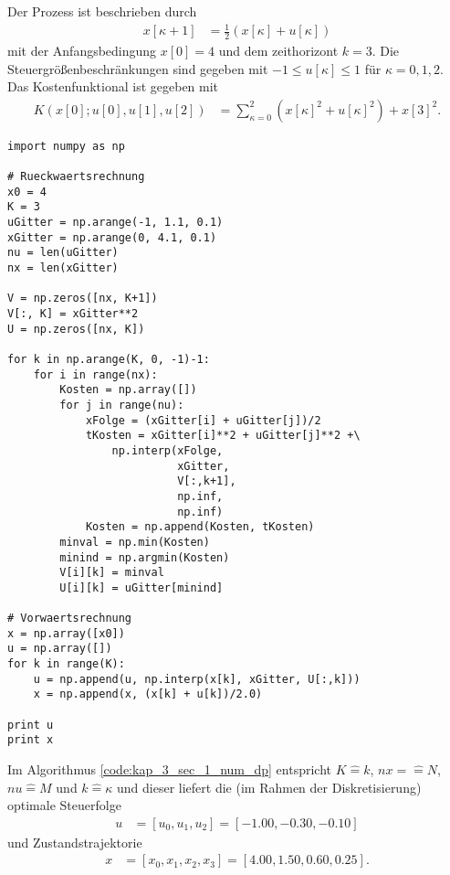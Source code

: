 \begin{exmp}
Der Prozess ist beschrieben durch
\begin{align}
	x[\kappa + 1] & = \frac{1}{2}\left(x[\kappa]+u[\kappa] \right)
\end{align}
mit der Anfangsbedingung $x[0] = 4$ und dem zeithorizont $k=3$. Die Steuergrößenbeschränkungen sind gegeben mit $-1\leq u[\kappa]\leq 1$ für $\kappa =
0,1,2$. Das Kostenfunktional ist gegeben mit
\begin{align}
	K\left(x[0];u[0],u[1],u[2] \right) & = \sum\limits_{\kappa = 0}^2\left(x[\kappa]^2+u[\kappa]^2 \right) + x[3]^2.
\end{align}
\begin{lstlisting}[style=PythonStyle, caption=Numerische Algorithmus der Dynamischen Programmierung, label=code:kap_3_sec_1_num_dp] 
import numpy as np

# Rueckwaertsrechnung
x0 = 4
K = 3
uGitter = np.arange(-1, 1.1, 0.1)
xGitter = np.arange(0, 4.1, 0.1)
nu = len(uGitter)
nx = len(xGitter)

V = np.zeros([nx, K+1])
V[:, K] = xGitter**2
U = np.zeros([nx, K])

for k in np.arange(K, 0, -1)-1:
    for i in range(nx):
        Kosten = np.array([])
        for j in range(nu):
            xFolge = (xGitter[i] + uGitter[j])/2
            tKosten = xGitter[i]**2 + uGitter[j]**2 +\
                np.interp(xFolge,
                          xGitter,
                          V[:,k+1],
                          np.inf,
                          np.inf)
            Kosten = np.append(Kosten, tKosten)
        minval = np.min(Kosten)
        minind = np.argmin(Kosten)
        V[i][k] = minval
        U[i][k] = uGitter[minind]

# Vorwaertsrechnung
x = np.array([x0])
u = np.array([])
for k in range(K):
    u = np.append(u, np.interp(x[k], xGitter, U[:,k]))
    x = np.append(x, (x[k] + u[k])/2.0)

print u
print x
\end{lstlisting}  
Im Algorithmus \ref{code:kap_3_sec_1_num_dp} entspricht $K\hat{=}k$, $nx=\hat{=}N$, $nu\hat{=}M$ und $k\hat{=}\kappa$ und dieser liefert die (im
Rahmen der Diskretisierung) optimale Steuerfolge
\begin{align*}
	u & = \left[u_0, u_1, u_2\right] = \left[-1.00, -0.30, -0.10\right]
\end{align*}
und Zustandstrajektorie
\begin{align*}
	x & = \left[x_0,x_1,x_2,x_3 \right]=\left[4.00,1.50,0.60,0.25 \right].
\end{align*}
\end{exmp}
